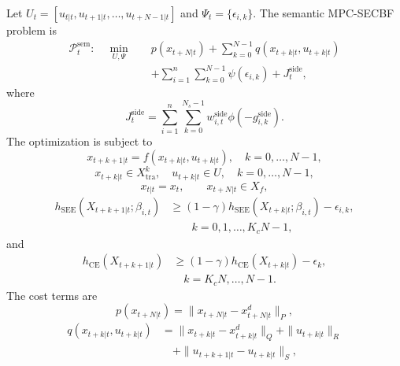 \documentclass[journal]{IEEEtranTIE}
\begin{document}
    Let $U_t=[u_{t|t},u_{t+1|t},\ldots,u_{t+N-1|t}]$ and
    $\Psi_t=\{\epsilon_{i,k}\}$. The semantic MPC-SECBF problem is
    \begin{equation}
    \begin{aligned}
    \mathcal{P}_t^{\mathrm{sem}}:\quad
    \min_{U,\Psi}\quad
    &p(x_{t+N|t})
    +\sum_{k=0}^{N-1}q(x_{t+k|t},u_{t+k|t})\\
    &+\sum_{i=1}^{n}\sum_{k=0}^{N-1}\psi(\epsilon_{i,k})
    +J_t^{\mathrm{side}} ,
    \end{aligned}
    \end{equation}
    where
    \begin{equation}
    J_t^{\mathrm{side}}
    =
    \sum_{i=1}^{n}\sum_{k=0}^{N_s-1}
    w_{i,t}^{\mathrm{side}}\phi(-g_{i,k}^{\mathrm{side}}).
    \end{equation}
    The optimization is subject to
    \begin{equation}
    x_{t+k+1|t}=f(x_{t+k|t},u_{t+k|t}),
    \quad k=0,\ldots,N-1,
    \end{equation}
    \begin{equation}
    x_{t+k|t}\in X_{\mathrm{tra}}^k,\quad
    u_{t+k|t}\in U,\quad k=0,\ldots,N-1,
    \end{equation}
    \begin{equation}
    x_{t|t}=x_t,\qquad x_{t+N|t}\in X_f,
    \end{equation}
    \begin{equation}
    \begin{aligned}
    h_{\mathrm{SEE}}(X_{t+k+1|t};\beta_{i,t})
    &\ge
    (1-\gamma)h_{\mathrm{SEE}}(X_{t+k|t};\beta_{i,t})
    -\epsilon_{i,k},\\
    &\qquad k=0,1,\ldots,K_cN-1,
    \end{aligned}
    \end{equation}
    and
    \begin{equation}
    \begin{aligned}
    h_{\mathrm{CE}}(X_{t+k+1|t})
    &\ge
    (1-\gamma)h_{\mathrm{CE}}(X_{t+k|t})-\epsilon_k,\\
    &\quad k=K_cN,\ldots,N-1.
    \end{aligned}
    \end{equation}
    The cost terms are
    \begin{equation}
    p(x_{t+N|t})=\|x_{t+N|t}-x^d_{t+N|t}\|_P,
    \end{equation}
    \begin{equation}
    \begin{aligned}
    q(x_{t+k|t},u_{t+k|t})
    &=
    \|x_{t+k|t}-x^d_{t+k|t}\|_Q
    +\|u_{t+k|t}\|_R\\
    &\quad
    +\|u_{t+k+1|t}-u_{t+k|t}\|_S,
    \end{aligned}
    \end{equation}
\end{document}
